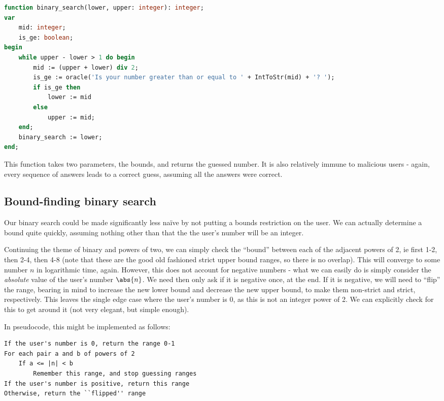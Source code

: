 \documentclass[fleqn,a4paper,11pt]{article}
\begin{document}
\begin{lstlisting}[language=Pascal, caption=Basic binary search in Pascal, label={lst:binarysearch}]
function binary_search(lower, upper: integer): integer;
var
    mid: integer;
    is_ge: boolean;
begin
    while upper - lower > 1 do begin
        mid := (upper + lower) div 2;
        is_ge := oracle('Is your number greater than or equal to ' + IntToStr(mid) + '? ');
        if is_ge then
            lower := mid
        else
            upper := mid;
    end;
    binary_search := lower;
end;
\end{lstlisting}

    This function takes two parameters, the bounds, and returns the guessed
    number. It is also relatively immune to malicious users - again, every
    sequence of answers leads to a correct guess, assuming all the answers were
    correct.

    \subsection{Bound-finding binary search}

    Our binary search could be made significantly less na\"ive by not putting a
    bounds restriction on the user. We can actually determine a bound quite
    quickly, assuming nothing other than that the the user's number will be an
    integer.

    Continuing the theme of binary and powers of two, we can simply check the
    ``bound'' between each of the adjacent powers of 2, ie first 1-2, then 2-4,
    then 4-8 (note that these are the good old fashioned strict upper bound
    ranges, so there is no overlap). This will converge to some number \(n\) in
    logarithmic time, again. However, this does not account for negative
    numbers - what we can easily do is simply consider the \emph{absolute}
    value of the user's number \(\abs{n}\). We need then only ask if it is
    negative once, at the end. If it is negative, we will need to ``flip'' the
    range, bearing in mind to increase the new lower bound and decrease the new
    upper bound, to make them non-strict and strict, respectively. This leaves
    the single edge case where the user's number is 0, as this is not an
    integer power of 2. We can explicitly check for this to get around it (not
    very elegant, but simple enough).

    In pseudocode, this might be implemented as follows:

\begin{lstlisting}[caption=Bound-finding pseudocode]
If the user's number is 0, return the range 0-1
For each pair a and b of powers of 2
    If a <= |n| < b
        Remember this range, and stop guessing ranges
If the user's number is positive, return this range
Otherwise, return the ``flipped'' range
\end{lstlisting}
\end{document}
